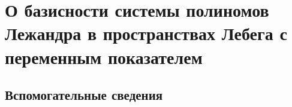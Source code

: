 


%


%
%


\chapter{О базисности системы полиномов Лежандра в пространствах Лебега с переменным показателем}



\section{Вспомогательные сведения}

